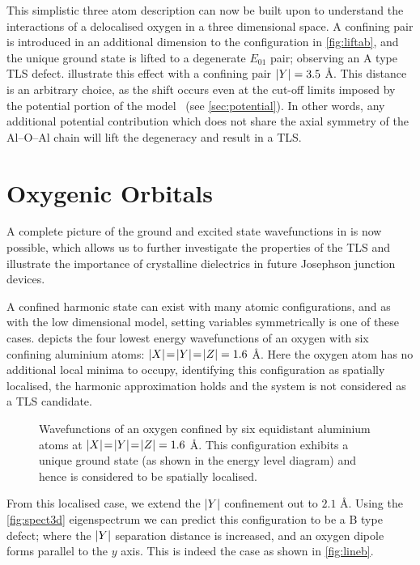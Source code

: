This simplistic three atom description can now be built upon to understand the interactions of a delocalised oxygen in a three dimensional space.
A confining pair is introduced in an additional dimension to the configuration in \cref{fig:liftab}, and the unique ground state is lifted to a degenerate $E_{01}$ pair; observing an A type TLS defect.
 illustrate this effect with a confining pair $\lvert Y\rvert = 3.5$ \AA.
This distance is an arbitrary choice, as the shift occurs even at the cut-off limits imposed by the potential portion of the model~\cite{Streitz1994} (see \cref{sec:potential}).
In other words, any additional potential contribution which does not share the axial symmetry of the Al--O--Al chain will lift the degeneracy and result in a TLS.

\section{Oxygenic Orbitals}\label{sec:orbitals}

A complete picture of the ground and excited state wavefunctions in  is now possible, which allows us to further investigate the properties of the TLS and illustrate the importance of crystalline dielectrics in future Josephson junction devices.

A confined harmonic state can exist with many atomic configurations, and as with the low dimensional model, setting variables symmetrically is one of these cases.
 depicts the four lowest energy wavefunctions of an oxygen with six confining aluminium atoms: $\lvert X\rvert\!=\!\lvert Y\rvert\!=\!\lvert Z\rvert = 1.6$ \AA.
Here the oxygen atom has no additional local minima to occupy, identifying this configuration as spatially localised, the harmonic approximation holds and the system is not considered as a TLS candidate.

\begin{figure}[htp]
  \resizebox{\textwidth}{!}{}
  \caption[Spatially Localised Configuration]{\label{fig:lineharm}Wavefunctions of an oxygen confined by six equidistant aluminium atoms at $\lvert X\rvert\!=\!\lvert Y\rvert\!=\!\lvert Z\rvert = 1.6$ \AA. This configuration exhibits a unique ground state (as shown in the energy level diagram) and hence is considered to be spatially localised.}
\end{figure}

From this localised case, we extend the $\lvert Y\rvert$ confinement out to $2.1$ \AA.
Using the \cref{fig:spect3d} eigenspectrum we can predict this configuration to be a B type defect; where the $\lvert Y\rvert$ separation distance is increased, and an oxygen dipole forms parallel to the $y$ axis.
This is indeed the case as shown in \cref{fig:lineb}.

